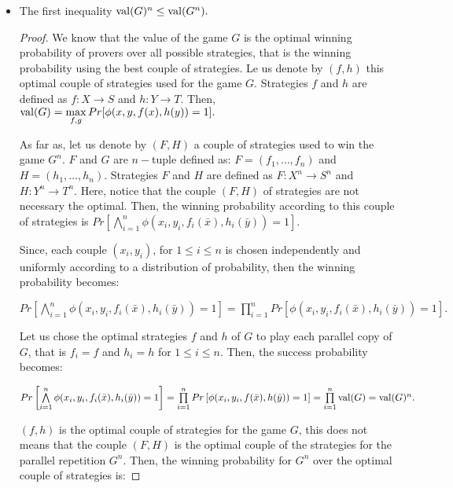 \begin{itemize}
\item The first inequality $\mathrm{val} (G)^n \leq \mathrm{val} (G^n) .$

\begin{proof}
We know that the value of the game $G$ is the optimal winning probability of provers over all possible strategies, that is the winning probability using the best couple of strategies. Le us denote by $(f,h)$ this optimal couple of strategies used for the game $G$. Strategies $f$ and $h$ are  defined as $f: X\longrightarrow S$ and  $h: Y\longrightarrow T.$  Then, $\mathrm{val} (G)= \max\limits_{f,g} Pr[\phi(x,y,f(x),h(y))=1].$

As far as, let us denote by $(F,H)$ a couple of strategies  used  to win the game $G^n$. $F$ and $G$ are $n-$tuple defined as: $F=(f_1, \ldots, f_n)$ and  $H=(h_1, \ldots, h_n)$. Strategies $F$ and $H$ are  defined as $F: X^n\longrightarrow S^n$ and  $H: Y^n\longrightarrow T^n.$ Here, notice that the couple $(F,H)$ of strategies are not necessary the optimal.
Then, the winning probability according to this couple of strategies is $Pr \left[\bigwedge\limits_{i=1}^n \phi (x_i,y_i, f_i(\bar{x}), h_i(\bar{y}))=1 \right].$

Since, each couple $(x_i,y_i)$, for $ 1\leq i \leq n$ is chosen independently and uniformly according to a distribution of probability, then the winning probability becomes: 

$Pr \left[\bigwedge\limits_{i=1}^n \phi (x_i,y_i, f_i(\bar{x}), h_i(\bar{y}))=1 \right]= \prod\limits_{i=1}^n Pr \left[ \phi (x_i,y_i, f_i(\bar{x}), h_i(\bar{y}))=1 \right].$


Let us chose the optimal strategies $f$ and $h$ of $G$ to play each parallel copy of $G$, that is $f_i=f$ and $h_i=h$ for $ 1\leq i \leq n$. Then, the success probability becomes:

$Pr \left[\bigwedge\limits_{i=1}^n \phi (x_i,y_i, f_i(\bar{x}), h_i(\bar{y}))=1 \right]= \prod\limits_{i=1}^n Pr \left[ \phi (x_i,y_i, f(\bar{x}), h(\bar{y}))=1 \right]=\prod\limits_{i=1}^n \mathrm{val} (G)= \mathrm{val} (G)^n.$

$(f,h)$ is the optimal couple of strategies for the game $G$, this does not means that the couple $(F,H)$  is the optimal couple of the strategies for the parallel repetition $G^n$. Then, the winning probability for $G^n$ over the optimal couple of strategies is:


\end{proof}
\end{itemize}
